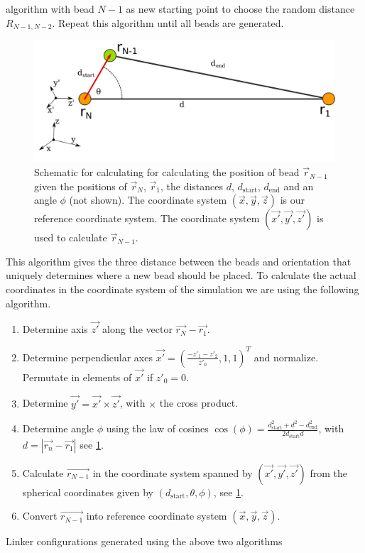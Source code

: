 \documentclass[12pt, twoside]{report}
\begin{document}
algorithm with bead $N-1$ as new starting point to choose the random distance
\(R_{N-1,N-2}\). Repeat this algorithm until all beads are generated.
\begin{figure}[!ht] \centering
\includegraphics[width=\textwidth]{figures/gaussian_chain_bead_construction.pdf}
\caption[Illustration of generating bead positions for a Gaussian polymer
model.]{Schematic for calculating for calculating the position of bead
$\vec{r}_{N-1}$ given the positions of $\vec{r}_N$, $\vec{r}_1$, the distances
$d$, $d_{\mathrm{start}}$, $d_{\mathrm{end}}$ and an angle $\phi$ (not shown).
The coordinate system $(\vec{x}, \vec{y}, \vec{z})$ is our reference coordinate
system. The coordinate system $(\vec{x'}, \vec{y'}, \vec{z'})$ is used to
calculate $\vec{r}_{N-1}$.}
\label{fig:bead-construction}
\end{figure} This algorithm gives the three distance between the beads and
orientation that uniquely determines where a new bead should be placed. To
calculate the actual coordinates in the coordinate system of the simulation we
are using the following algorithm.
\begin{enumerate}
  \item Determine axis $\vec{z'}$ along the vector $\vec{r_N} - \vec{r_1}$.
  \item Determine perpendicular axes $\vec{x'}=\left(\frac{-z'_1-z'_2}{z'_0},1,
1\right)^T$ and normalize. Permutate in elements of $\vec{x'}$ if $z'_0=0$.
  \item Determine $\vec{y'} = \vec{x'} \times \vec{z'}$, with \(\times\) the
cross product.
  \item Determine angle \(\phi\) using the law of cosines
$\cos(\phi)=\frac{d_{\mathrm{start}}^2 + d^2 - d_{\mathrm{end}}^2}{ 2
d_{\mathrm{start}} d}$, with $d=|\vec{r_n} - \vec{r_1}|$ see
\cref{fig:bead-construction}.
  \item Calculate $\vec{r_{N-1}}$ in the coordinate system spanned by
$(\vec{x'}, \vec{y'}, \vec{z'})$ from the spherical coordinates given by
$(d_{\mathrm{start}}, \theta, \phi)$, see \cref{fig:bead-construction}.
  \item Convert $\vec{r_{N-1}}$ into reference coordinate system $(\vec{x},
\vec{y}, \vec{z})$.
\end{enumerate} Linker configurations generated using the above two algorithms
\end{document}
